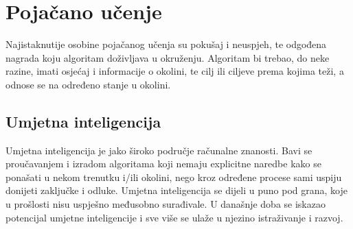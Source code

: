 \section{Pojačano učenje}
Najistaknutije osobine pojačanog učenja su pokušaj i neuspjeh, te odgođena nagrada koju algoritam doživljava u okruženju. Algoritam bi trebao, do neke razine, imati osjećaj i informacije o okolini, te cilj ili ciljeve prema kojima teži, a odnose se na određeno stanje u okolini.

\subsection{Umjetna inteligencija}
Umjetna inteligencija je jako široko područje računalne znanosti. Bavi se proučavanjem i izradom algoritama koji nemaju explicitne naredbe kako se ponašati u nekom trenutku i/ili okolini, nego kroz određene procese sami uspiju donijeti zaključke i odluke. Umjetna inteligencija se dijeli u puno pod grana, koje u prošlosti nisu uspješno međusobno surađivale. U današnje doba se iskazao potencijal umjetne inteligencije i sve više se ulaže u njezino istraživanje i razvoj. 

